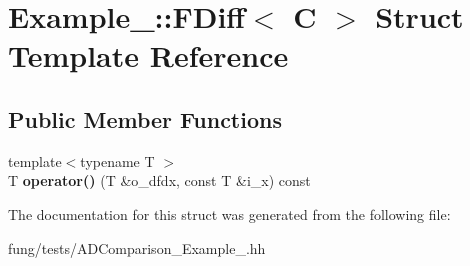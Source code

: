 \hypertarget{structExample__1_1_1FDiff}{\section{Example\-\_\-:\-:F\-Diff$<$ C $>$ Struct Template Reference}
\label{structExample__1_1_1FDiff}
}
\subsection*{Public Member Functions}
\begin{DoxyCompactItemize}
\item 
\hypertarget{structExample__1_1_1FDiff_aa2bd6fd1c88f5e298e532c20ece08ae0}{{\footnotesize template$<$typename T $>$ }\\T {\bfseries operator()} (T \&o\-\_\-dfdx, const T \&i\-\_\-x) const }\label{structExample__1_1_1FDiff_aa2bd6fd1c88f5e298e532c20ece08ae0}

\end{DoxyCompactItemize}


The documentation for this struct was generated from the following file\-:\begin{DoxyCompactItemize}
\item 
fung/tests/A\-D\-Comparison\-\_\-\-Example\-\_.\-hh\end{DoxyCompactItemize}

